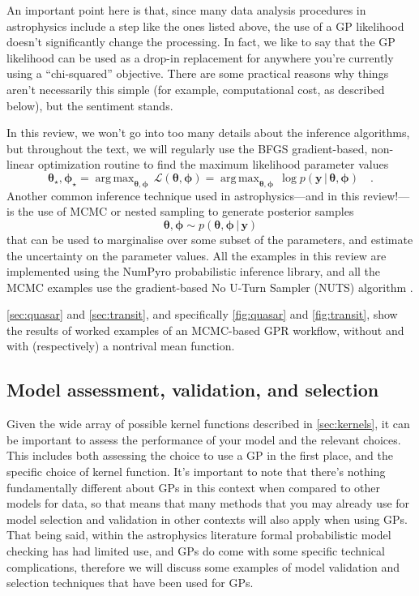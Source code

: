 \documentclass[letterpaper]{ar-1col}
\newcommand{\ydata}{\ensuremath{\boldsymbol{y}}}
\newcommand{\hyperparams}{\ensuremath{\boldsymbol{\phi}}}
\newcommand{\meanparams}{\ensuremath{\boldsymbol{\theta}}}
\DeclareMathOperator*{\argmax}{arg\,max}
\begin{document}
An important point here is that, since many data analysis procedures in astrophysics include a step like the ones listed above, the use of a GP likelihood doesn't significantly change the processing.
In fact, we like to say that the GP likelihood can be used as a drop-in replacement for anywhere you're currently using a ``chi-squared'' objective.
There are some practical reasons why things aren't necessarily this simple (for example, computational cost, as described below), but the sentiment stands.

In this review, we won't go into too many details about the inference algorithms, but throughout the text, we will regularly use the \textsf{BFGS} gradient-based, non-linear optimization routine \citep{Nocedal:1999, scipy} to find the maximum likelihood parameter values
\begin{equation}
  \meanparams_\star,\hyperparams_\star = \argmax_{\meanparams,\hyperparams} \,\mathcal{L}(\meanparams,\hyperparams) = \argmax_{\meanparams,\hyperparams} \,\log p(\ydata\,|\,\meanparams,\hyperparams) \quad.
\end{equation}
Another common inference technique used in astrophysics---and in this review!---is the use of MCMC or nested sampling \citep{skilling2006nested} to generate posterior samples
\begin{equation}
  \meanparams,\hyperparams \sim p(\meanparams,\hyperparams\,|\,\ydata)
\end{equation}
that can be used to marginalise over some subset of the parameters, and estimate the uncertainty on the parameter values.
All the examples in this review are implemented using the \textsf{NumPyro} probabilistic inference library, and all the MCMC examples use the gradient-based No U-Turn Sampler (NUTS) algorithm \citep{Hoffman:2014}.

\autoref{sec:quasar} and \autoref{sec:transit}, and specifically \autoref{fig:quasar} and \autoref{fig:transit}, show the results of worked examples of an MCMC-based GPR workflow, without and with (respectively) a nontrival mean function.


\subsection{Model assessment, validation, and selection}
\label{sec:model_selection}

Given the wide array of possible kernel functions described in \autoref{sec:kernels}, it can be important to assess the performance of your model and the relevant choices.
This includes both assessing the choice to use a GP in the first place, and the specific choice of kernel function.
It's important to note that there's nothing fundamentally different about GPs in this context when compared to other models for data, so that means that many methods that you may already use for model selection and validation in other contexts will also apply when using GPs.
That being said, within the astrophysics literature formal probabilistic model checking has had limited use, and GPs do come with some specific technical complications, therefore we will discuss some examples of model validation and selection techniques that have been used for GPs.
\end{document}

